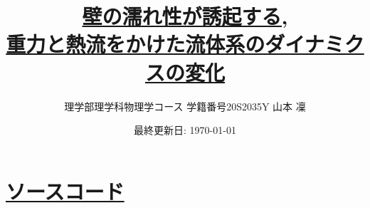 \documentclass[dvipdfmx]{jsarticle}
\begin{document}
\title{\href{https://github.com/m-agnet/Report.git}{壁の濡れ性が誘起する, \\ 重力と熱流をかけた流体系のダイナミクスの変化}}
\author{理学部理学科物理学コース 学籍番号20S2035Y 山本 凜}
\date{最終更新日: \today}
\maketitle
\newpage
\setcounter{tocdepth}{3}
\tableofcontents
\newpage











\appendix
\section{\href{https://github.com/m-agnet/Report.git}{ソースコード}}







\end{document}
